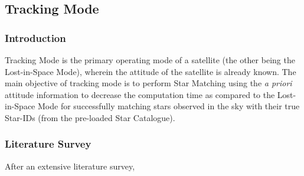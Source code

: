 \subsection{Tracking Mode}

\subsubsection{Introduction}
Tracking Mode is the primary operating mode of a satellite (the other being the Lost-in-Space Mode), wherein the attitude of the satellite is already known. The main objective of tracking mode is to perform Star Matching using the \textit{a priori} attitude information to decrease the computation time as compared to the Lost-in-Space Mode for successfully matching stars observed in the sky with their true Star-IDs (from the pre-loaded Star Catalogue). 

\subsubsection{Literature Survey}
After an extensive literature survey, 


